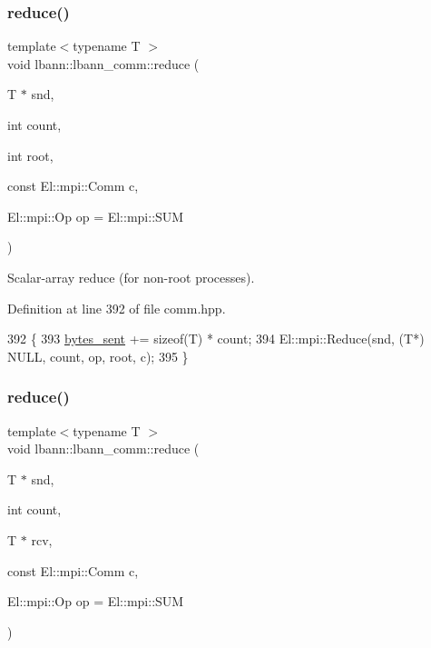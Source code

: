 \subsubsection{\texorpdfstring{reduce()}{reduce()}\hspace{0.1cm}{\footnotesize\ttfamily [3/4]}}
{\footnotesize\ttfamily template$<$typename T $>$ \\
void lbann\+::lbann\+\_\+comm\+::reduce (\begin{DoxyParamCaption}\item[{T $\ast$}]{snd,  }\item[{int}]{count,  }\item[{int}]{root,  }\item[{const El\+::mpi\+::\+Comm}]{c,  }\item[{El\+::mpi\+::\+Op}]{op = {\ttfamily El\+:\+:mpi\+:\+:SUM} }\end{DoxyParamCaption})\hspace{0.3cm}{\ttfamily [inline]}}

Scalar-\/array reduce (for non-\/root processes). 

Definition at line 392 of file comm.\+hpp.


\begin{DoxyCode}
392                                                                                      \{
393     \hyperlink{classlbann_1_1lbann__comm_ad1f146ae7337ece6266fd307944928e0}{bytes\_sent} += \textcolor{keyword}{sizeof}(T) * count;
394     El::mpi::Reduce(snd, (T*) NULL, count, op, root, c);
395   \}
\end{DoxyCode}
\mbox{\label{classlbann_1_1lbann__comm_a476ad01cab90fd01228ec1273a8e389e}} 
\subsubsection{\texorpdfstring{reduce()}{reduce()}\hspace{0.1cm}{\footnotesize\ttfamily [4/4]}}
{\footnotesize\ttfamily template$<$typename T $>$ \\
void lbann\+::lbann\+\_\+comm\+::reduce (\begin{DoxyParamCaption}\item[{T $\ast$}]{snd,  }\item[{int}]{count,  }\item[{T $\ast$}]{rcv,  }\item[{const El\+::mpi\+::\+Comm}]{c,  }\item[{El\+::mpi\+::\+Op}]{op = {\ttfamily El\+:\+:mpi\+:\+:SUM} }\end{DoxyParamCaption})\hspace{0.3cm}{\ttfamily [inline]}}

